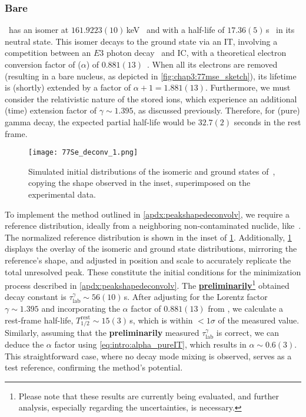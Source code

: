 \subsubsection{Bare \,}\label{subsubsec:chap3:bare77se}

\, has an isomer at $161.9223(10)$\,keV~\cite{ENSDF} and with a half-life of $17.36(5)$\,s~\cite{ENSDF} in its neutral state. This isomer decays to the ground state via an \textsc{IT}, involving a competition between an $E3$ photon decay~\cite{ENSDF} and \textsc{IC}, with a theoretical electron conversion factor of ($\alpha$) of $0.881(13)$~\cite{KIBEDI2008202}. When all its electrons are removed (resulting in a bare nucleus, as depicted in \cref{fig:chap3:77mse_sketch}), its lifetime is (shortly) extended by a factor of $\alpha + 1 = 1.881(13)$. Furthermore, we must consider the relativistic nature of the stored ions, which experience an additional (time) extension factor of $\gamma \sim 1.395$, as discussed previously.
Therefore, for (pure) gamma decay, the expected partial half-life would be $32.7(2)$ seconds in the rest frame.
\begin{figure}[hbt]
  \centering
  \texttt{[image: 77Se\_deconv\_1.png]}
  \caption{Simulated initial distributions of the isomeric and ground states of \,, copying the shape observed in the inset, superimposed on the experimental data.}
  \label{fig:chap3:77Se34h127deconvolution}
  \end{figure}

To implement the method outlined in \cref{apdx:peakshapedeconvolv}, we require a reference distribution, ideally from a neighboring non-contaminated nuclide, like \,. The normalized reference distribution is shown in the inset of \cref{fig:chap3:77Se34h127deconvolution}. Additionally, \cref{fig:chap3:77Se34h127deconvolution} displays the overlay of the isomeric and ground state distributions, mirroring the reference's shape, and adjusted in position and scale to accurately replicate the total unresolved peak. 
These constitute the initial conditions for the minimization process described in \cref{apdx:peakshapedeconvolv}. 
\newpar
The \underline{\textbf{preliminarily}}\footnote{Please note that these results are currently being evaluated, and further analysis, especially regarding the uncertainties, is necessary.
} obtained decay constant is $\tau_{\mathrm{lab}}^{\gamma} \sim 56(10)$\,s. After adjusting for the Lorentz factor $\gamma \sim 1.395$ and incorporating the $\alpha$ factor of $0.881(13)$ from \cite{KIBEDI2008202}, we calculate a rest-frame half-life, $T_{1/2}^{\mathrm{rest}} \sim 15(3)$\,s, which is within $<1\sigma$ of the measured value.
Similarly, assuming that the \textbf{preliminarily} measured $\tau_{\mathrm{lab}}^{\gamma}$ is correct, we can deduce the $\alpha$ factor using \cref{eq:intro:alpha_pureIT}, which results in $\alpha \sim 0.6(3)$. This straightforward case, where no decay mode mixing is observed, serves as a test reference, confirming the method's potential.

